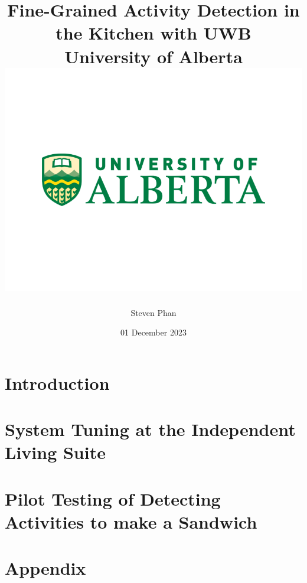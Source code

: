 \documentclass[12pt]{report}
\title{
    {Fine-Grained Activity Detection in the Kitchen with UWB}\\
    {\large University of Alberta}\\
    {\includegraphics[width=\textwidth]{university.png}}
}
\author{Steven Phan}
\date{01 December 2023}
\begin{document}
\maketitle


\tableofcontents

\chapter{Introduction}


\chapter{System Tuning at the Independent Living Suite}\label{chp2}


\chapter{Pilot Testing of Detecting Activities to make a Sandwich}

\appendix
\chapter{Appendix}





\end{document}
